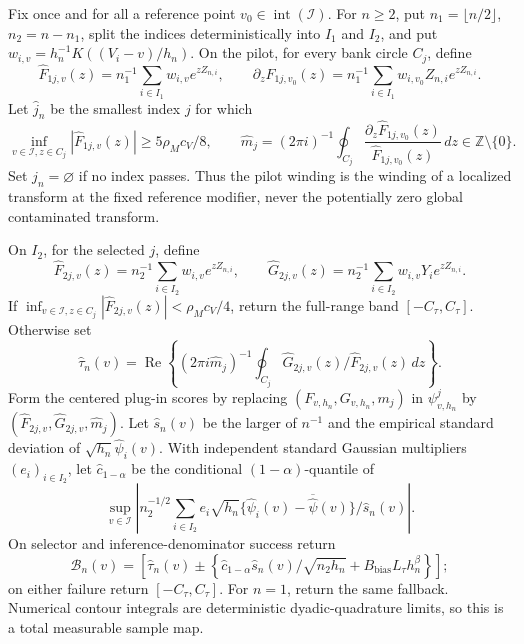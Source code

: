 Fix once and for all a reference point \(v_0\in\operatorname{int}(\mathcal I)\). For \(n\ge2\), put \(n_1=\lfloor n/2\rfloor\), \(n_2=n-n_1\), split the indices deterministically into \(I_1\) and \(I_2\), and put \(w_{i,v}=h_n^{-1}K((V_i-v)/h_n)\). On the pilot, for every bank circle \(C_j\), define
\[
 \widehat F_{1j,v}(z)=n_1^{-1}\sum_{i\in I_1}w_{i,v}e^{zZ_{n,i}},
 \qquad
 \partial_z\widehat F_{1j,v_0}(z)
 =n_1^{-1}\sum_{i\in I_1}w_{i,v_0}Z_{n,i}e^{zZ_{n,i}}.
\]
Let \(\widehat j_n\) be the smallest index \(j\) for which
\[
 \inf_{v\in\mathcal I,z\in C_j}|\widehat F_{1j,v}(z)|
 \ge5\rho_Mc_V/8,
 \qquad
 \widehat m_j=(2\pi i)^{-1}\oint_{C_j}
 \frac{\partial_z\widehat F_{1j,v_0}(z)}{\widehat F_{1j,v_0}(z)}\,dz
 \in\mathbb Z\setminus\{0\}.
\]
Set \(\widehat j_n=\varnothing\) if no index passes. Thus the pilot winding is the winding of a localized transform at the fixed reference modifier, never the potentially zero global contaminated transform.

On \(I_2\), for the selected \(j\), define
\[
 \widehat F_{2j,v}(z)=n_2^{-1}\sum_{i\in I_2}w_{i,v}e^{zZ_{n,i}},
 \qquad
 \widehat G_{2j,v}(z)=n_2^{-1}\sum_{i\in I_2}w_{i,v}Y_i e^{zZ_{n,i}}.
\]
If \(\inf_{v\in\mathcal I,z\in C_j}|\widehat F_{2j,v}(z)|<\rho_Mc_V/4\), return the full-range band \([-C_\tau,C_\tau]\). Otherwise set
\[
 \widehat\tau_n(v)=\operatorname{Re}\left\{(2\pi i\widehat m_j)^{-1}
 \oint_{C_j}\widehat G_{2j,v}(z)/\widehat F_{2j,v}(z)\,dz\right\}.
\]
Form the centered plug-in scores by replacing \((F_{v,h_n},G_{v,h_n},m_j)\) in \(\psi^j_{v,h_n}\) by \((\widehat F_{2j,v},\widehat G_{2j,v},\widehat m_j)\). Let \(\widehat s_n(v)\) be the larger of \(n^{-1}\) and the empirical standard deviation of \(\sqrt{h_n}\widehat\psi_i(v)\). With independent standard Gaussian multipliers \((e_i)_{i\in I_2}\), let \(\widehat c_{1-\alpha}\) be the conditional \((1-\alpha)\)-quantile of
\[
 \sup_{v\in\mathcal I}\left|n_2^{-1/2}\sum_{i\in I_2}e_i\sqrt{h_n}
 \{\widehat\psi_i(v)-\overline{\widehat\psi}(v)\}/\widehat s_n(v)\right|.
\]
On selector and inference-denominator success return
\[
 \mathcal B_n(v)=\left[\widehat\tau_n(v)\pm
 \left\{\widehat c_{1-\alpha}\widehat s_n(v)/\sqrt{n_2h_n}
 +B_{\mathrm{bias}}L_\tau h_n^\beta\right\}\right];
\]
on either failure return \([-C_\tau,C_\tau]\). For \(n=1\), return the same fallback. Numerical contour integrals are deterministic dyadic-quadrature limits, so this is a total measurable sample map.